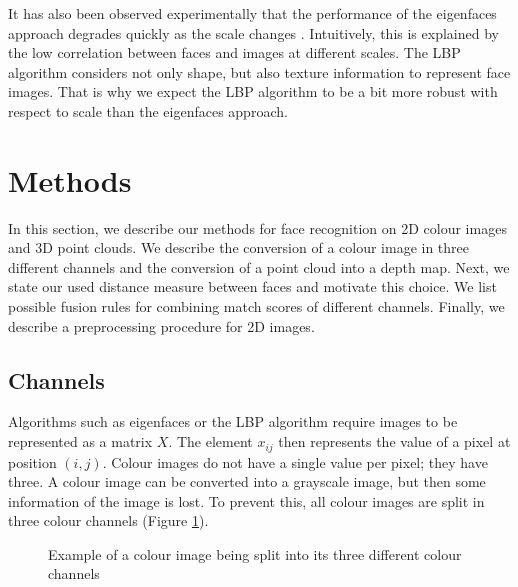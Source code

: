 \documentclass[]{article}
\begin{document}
It has also been observed experimentally that the performance of the eigenfaces approach degrades quickly as the scale changes \cite{tsalakanidou2003use}. Intuitively, this is explained by the low correlation between faces and images at different scales. The LBP algorithm considers not only shape, but also texture information to represent face images. That is why we expect the LBP algorithm to be a bit more robust with respect to scale than the eigenfaces approach.


\section{Methods}
\graphicspath{{img/methods/}}
In this section, we describe our methods for face recognition on 2D colour images and 3D point clouds. We describe the conversion of a colour image in three different channels and the conversion of a point cloud into a depth map. Next, we state our used distance measure between faces and motivate this choice. We list possible fusion rules for combining match scores of different channels. Finally, we describe a preprocessing procedure for 2D images.

\subsection{Channels}
Algorithms such as eigenfaces or the LBP algorithm require images to be represented as a matrix $X$. The element $x_{ij}$ then represents the value of a pixel at position $(i,j)$. Colour images do not have a single value per pixel; they have three. A colour image can be converted into a grayscale image, but then some information of the image is lost. To prevent this, all colour images are split in three colour channels (Figure \ref{fig:colour-channels}).

\begin{figure}
	\centering
	\caption{Example of a colour image being split into its three different colour channels}
	\label{fig:colour-channels}
\end{figure}
\end{document}
